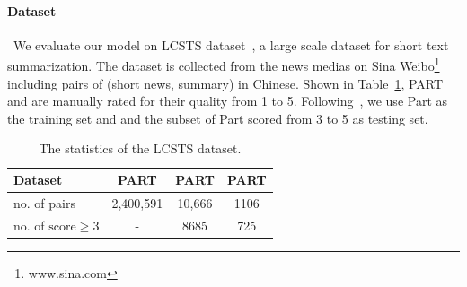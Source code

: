 \paragraph{Dataset}~We evaluate our model on LCSTS dataset~\cite{hu2015lcsts},  a large scale dataset for short text summarization. The dataset is collected from the news medias on Sina Weibo\footnote{www.sina.com} including pairs of (short news, summary) in Chinese. Shown in Table~\ref{cp3.table.lcsts},  PART \uppercase\expandafter{}  and  \uppercase\expandafter{} are manually rated for their quality from 1 to 5. Following~\cite{hu2015lcsts}, we use Part \uppercase\expandafter{}  as the training set and and the subset of Part  \uppercase\expandafter{} scored from 3 to 5 as testing set. 

\begin{table}[hptb] %
\centering
\begin{tabular}{l|ccc}
\toprule
Dataset & PART \uppercase\expandafter{\romannumeral1}  & PART \uppercase\expandafter{\romannumeral2}  & PART \uppercase\expandafter{\romannumeral3} \\
\midrule
no. of pairs & 2,400,591  &  10,666 & 1106\\
no. of $\text{score} \geq 3$ & - & 8685 & 725 \\
\bottomrule
\end{tabular} 
\caption{\label{cp3.table.lcsts} The statistics of the LCSTS dataset.} %
\end{table}

